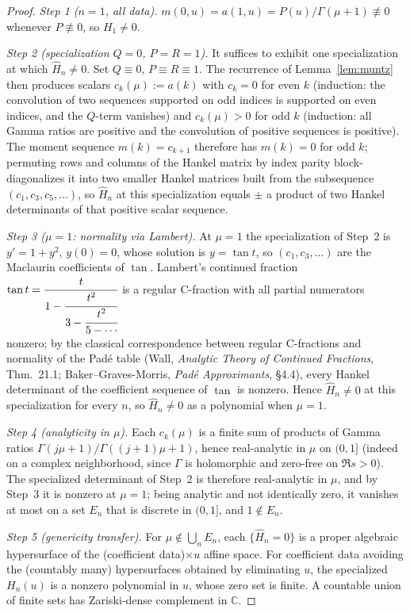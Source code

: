 \documentclass[11pt]{article}
\theoremstyle{definition}
\begin{document}
\begin{proof}
\emph{Step 1 ($n=1$, all data).}
$m(0,u) = a(1,u) = P(u)/\Gamma(\mu+1) \not\equiv 0$ whenever
$P \not\equiv 0$, so $H_{1} \neq 0$.

\emph{Step 2 (specialization $Q = 0$, $P = R = 1$).}
It suffices to exhibit one specialization at which
$\widehat H_{n} \neq 0$. Set $Q \equiv 0$, $P \equiv R \equiv 1$. The
recurrence of Lemma~\ref{lem:muntz} then produces scalars
$c_{k}(\mu) := a(k)$ with $c_{k} = 0$ for even $k$ (induction: the
convolution of two sequences supported on odd indices is supported on
even indices, and the $Q$-term vanishes) and $c_{k}(\mu) > 0$ for odd
$k$ (induction: all Gamma ratios are positive and the convolution of
positive sequences is positive). The moment sequence
$m(k) = c_{k+1}$ therefore has $m(k) = 0$ for odd $k$; permuting rows
and columns of the Hankel matrix by index parity block-diagonalizes it
into two smaller Hankel matrices built from the subsequence
$(c_{1}, c_{3}, c_{5}, \ldots)$, so
$\widehat H_{n}$ at this specialization equals $\pm$ a product of two
Hankel determinants of that positive scalar sequence.

\emph{Step 3 ($\mu = 1$: normality via Lambert).}
At $\mu = 1$ the specialization of Step~2 is $y' = 1 + y^{2}$,
$y(0)=0$, whose solution is $y = \tan t$, so
$(c_{1}, c_{3}, \ldots)$ are the Maclaurin coefficients of $\tan$.
Lambert's continued fraction
$\tan t = \cfrac{t}{1 - \cfrac{t^{2}}{3 - \cfrac{t^{2}}{5 - \cdots}}}$
is a regular C-fraction with all partial numerators nonzero; by the
classical correspondence between regular C-fractions and normality of
the Pad\'e table (Wall, \emph{Analytic Theory of Continued
Fractions}, Thm.~21.1; Baker--Graves-Morris, \emph{Pad\'e
Approximants}, \S4.4), every Hankel determinant of the coefficient
sequence of $\tan$ is nonzero. Hence $\widehat H_{n} \neq 0$ at this
specialization for every $n$, so $\widehat H_{n} \neq 0$ as a
polynomial when $\mu = 1$.

\emph{Step 4 (analyticity in $\mu$).}
Each $c_{k}(\mu)$ is a finite sum of products of Gamma ratios
$\Gamma(j\mu+1)/\Gamma((j+1)\mu+1)$, hence real-analytic in $\mu$ on
$(0,1]$ (indeed on a complex neighborhood, since $\Gamma$ is
holomorphic and zero-free on $\Re s > 0$). The specialized
determinant of Step~2 is therefore real-analytic in $\mu$, and by
Step~3 it is nonzero at $\mu = 1$; being analytic and not identically
zero, it vanishes at most on a set $E_{n}$ that is discrete in
$(0,1]$, and $1 \notin E_{n}$.

\emph{Step 5 (genericity transfer).}
For $\mu \notin \bigcup_{n} E_{n}$, each
$\{\widehat H_{n} = 0\}$ is a proper algebraic hypersurface of the
(coefficient data)$\times u$ affine space. For coefficient data
avoiding the (countably many) hypersurfaces obtained by eliminating
$u$, the specialized $H_{n}(u)$ is a nonzero polynomial in $u$, whose
zero set is finite. A countable union of finite sets has Zariski-dense
complement in $\mathbb{C}$.


\end{proof}
\end{document}
